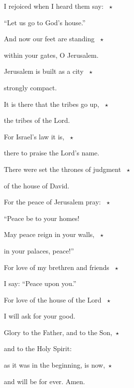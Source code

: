 \noindent I rejoiced when I heard them say: ~$\star$~\nopagebreak

“Let us go to God’s house.”

\noindent And now our feet are standing ~$\star$~\nopagebreak

within your gates, O Jerusalem.

\noindent Jerusalem is built as a city ~$\star$~\nopagebreak

strongly compact.

\noindent It is there that the tribes go up, ~$\star$~\nopagebreak

the tribes of the Lord.

\noindent For Israel’s law it is, ~$\star$~\nopagebreak

there to praise the Lord’s name.

\noindent There were set the thrones of judgment ~$\star$~\nopagebreak

of the house of David.

\noindent For the peace of Jerusalem pray: ~$\star$~\nopagebreak

“Peace be to your homes!

\noindent May peace reign in your walls, ~$\star$~\nopagebreak

in your palaces, peace!”

\noindent For love of my brethren and friends ~$\star$~\nopagebreak

I say: “Peace upon you.”

\noindent For love of the house of the Lord ~$\star$~\nopagebreak

I will ask for your good.

\noindent Glory to the Father, and to the Son,~$\star$~\nopagebreak

and to the Holy Spirit:

\noindent as it was in the beginning, is now,~$\star$~\nopagebreak

and will be for ever. Amen.
